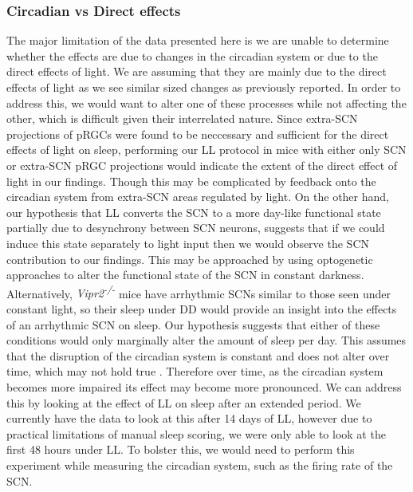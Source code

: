 \subsubsection{Circadian vs Direct effects}
The major limitation of the data presented here is we are unable to 
determine whether the effects are due to changes in the circadian
system or due to the direct effects of light.
We are assuming that they are mainly due to the direct effects 
of light as we see similar sized changes as previously 
reported\cite{muindi_acute_2013}.
In order to address this, we would want to alter one of these processes
while not affecting the other, which is difficult given their interrelated
nature. 
Since extra-SCN projections of pRGCs were found to be neccessary and 
sufficient for the direct effects of light on sleep\cite{rupp_distinct_2019},
performing our LL protocol in mice with either only SCN or extra-SCN pRGC 
projections would indicate the extent of the direct effect of light 
in our findings.
Though this may be complicated by feedback onto the 
circadian system from extra-SCN areas regulated by light.
On the other hand, our hypothesis that LL converts the SCN to a more
day-like functional state partially 
due to desynchrony between SCN neurons, 
suggests that if we could induce this state separately to 
light input then we would observe the SCN contribution to our 
findings. 
This may be approached by using optogenetic approaches to 
alter the functional state of the SCN in
constant darkness\cite{jones_manipulating_2015, mazuski_entrainment_2018}. 
Alternatively, \emph{Vipr2\textsuperscript{-/-}} mice have arrhythmic SCNs similar
to those seen under constant light\cite{hughes_constant_2015, 
ohta_constant_2005}, so their sleep under DD would provide an
insight into the effects of an arrhythmic SCN on sleep. 
Our hypothesis suggests that either of these conditions would only 
marginally alter the amount of sleep per day.
This assumes that the disruption of the circadian system is 
constant and does not alter over time, which may not hold true
\cite{coomans_detrimental_2013}.
Therefore over time, as the circadian system becomes more impaired
its effect may become more pronounced.
We can address this by looking at the effect of LL on sleep after 
an extended period.
We currently have the data to look at this after 14 days of LL, 
however due to practical limitations of manual sleep scoring, 
we were only able to look at the first 48 hours under LL.
To bolster this, we would need to perform this experiment while measuring
the circadian system, such as the firing rate of the SCN. 

